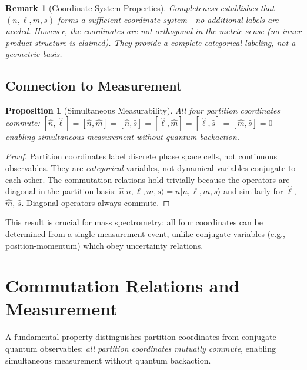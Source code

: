 \documentclass[twocolumn,10pt]{article}
\newtheorem{proposition}[theorem]{Proposition}
\newtheorem{remark}[theorem]{Remark}
\begin{document}
\begin{remark}[Coordinate System Properties]
Completeness establishes that $(n, \ell, m, s)$ forms a \emph{sufficient coordinate system}---no additional labels are needed. However, the coordinates are not orthogonal in the metric sense (no inner product structure is claimed). They provide a complete \emph{categorical} labeling, not a geometric basis.
\end{remark}



\subsection{Connection to Measurement}

\begin{proposition}[Simultaneous Measurability]
\label{prop:commutation}
All four partition coordinates commute:
$
[\hat{n}, \hat{\ell}] = [\hat{n}, \hat{m}] = [\hat{n}, \hat{s}] = [\hat{\ell}, \hat{m}] = [\hat{\ell}, \hat{s}] = [\hat{m}, \hat{s}] = 0
$
enabling simultaneous measurement without quantum backaction.
\end{proposition}

\begin{proof}
Partition coordinates label discrete phase space cells, not continuous observables. They are \emph{categorical} variables, not dynamical variables conjugate to each other. The commutation relations hold trivially because the operators are diagonal in the partition basis:
$
\hat{n}|n, \ell, m, s\rangle = n|n, \ell, m, s\rangle
$
and similarly for $\hat{\ell}$, $\hat{m}$, $\hat{s}$. Diagonal operators always commute.
\end{proof}

This result is crucial for mass spectrometry: all four coordinates can be determined from a single measurement event, unlike conjugate variables (e.g., position-momentum) which obey uncertainty relations.

\section{Commutation Relations and Measurement}
\label{sec:commutation}

A fundamental property distinguishes partition coordinates from conjugate quantum observables: \emph{all partition coordinates mutually commute}, enabling simultaneous measurement without quantum backaction.
\end{document}
